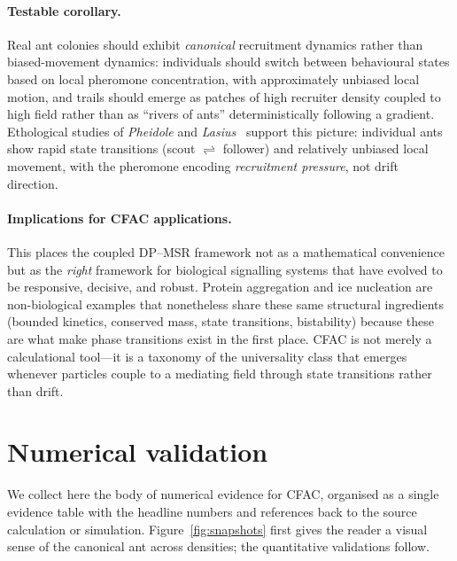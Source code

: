 \documentclass[10pt,a4paper,twocolumn]{article}
\theoremstyle{definition}
\begin{document}
\paragraph{Testable corollary.}
Real ant colonies should exhibit \emph{canonical} recruitment
dynamics rather than biased-movement dynamics: individuals
should switch between behavioural states based on local
pheromone concentration, with approximately unbiased local
motion, and trails should emerge as patches of high recruiter
density coupled to high field rather than as ``rivers of ants''
deterministically following a gradient.  Ethological studies of
\textit{Pheidole} and \textit{Lasius}~\citep{Sumpter2010,Gordon2010}
support this picture: individual ants show rapid state
transitions (scout $\rightleftharpoons$ follower) and
relatively unbiased local movement, with the pheromone encoding
\emph{recruitment pressure}, not drift direction.

\paragraph{Implications for CFAC applications.}
This places the coupled DP--MSR framework not as a mathematical
convenience but as the \emph{right} framework for biological
signalling systems that have evolved to be responsive, decisive,
and robust.  Protein aggregation and ice nucleation are
non-biological examples that nonetheless share these same
structural ingredients (bounded kinetics, conserved mass, state
transitions, bistability) because these are what make phase
transitions exist in the first place.  CFAC is not merely a
calculational tool---it is a taxonomy of the universality class
that emerges whenever particles couple to a mediating field
through state transitions rather than drift.

\section{Numerical validation}\label{sec:validation}

We collect here the body of numerical evidence for CFAC,
organised as a single evidence table with the headline numbers
and references back to the source calculation or
simulation.  Figure~\ref{fig:snapshots} first gives the reader
a visual sense of the canonical ant across densities; the
quantitative validations follow.
\end{document}

